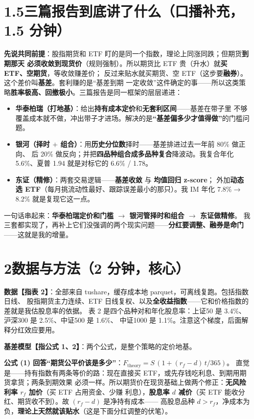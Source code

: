 \documentclass[11pt]{ctexart}
\newcommand{\cue}[1]{{\color{cue}\textbf{【#1】}}}
\begin{document}
\section*{1.5\quad 三篇报告到底讲了什么（口播补充，1.5 分钟）}
\textbf{先说共同前提}：股指期货和 ETF 盯的是同一个指数，理论上同涨同跌；但期货\textbf{到期那天
必须收敛到现货价}（规则强制）。所以期货比 ETF 贵（升水）就\textbf{买 ETF、空期货}，等收敛赚差价；
反过来贴水就买期货、空 ETF（这步要\textbf{融券}）。这个差价叫\textbf{基差}。套利赚的是``基差到期
一定收敛''这件确定的事——所以这类策略\textbf{胜率极高、回撤极小}。三篇报告是同一框架的层层递进：

\begin{itemize}
  \item \textbf{华泰柏瑞（打地基）}：给出\textbf{持有成本定价}和\textbf{无套利区间}——基差在带子里
        不够覆盖成本就不做，冲出带子才进场。解决的是\textbf{``基差偏多少才值得做''}的门槛问题。
  \item \textbf{银河（择时 $+$ 组合）}：用\textbf{历史分位数}择时——基差排进过去一年前 80\% 做正向、
        后 20\% 做反向；并把\textbf{四品种组合成多品种复合}降波动。我复合年化 5.6\%、夏普 1.94
        就是对标它的 6.6\% / 1.78。
  \item \textbf{东证（精修）}：两套交易逻辑——\textbf{基差收敛} 与 \textbf{均值回归 z-score}；
        外加\textbf{动态选 ETF}（每月挑流动性最好、跟踪误差最小的那只）。我 IM 年化 7.8\%$\to$8.2\%
        就是复现它这一点。
\end{itemize}

\noindent 一句话串起来：\textbf{华泰柏瑞定价和门槛 $\to$ 银河管择时和组合 $\to$ 东证做精修}。
我三套都实现了，再补上它们没强调的两个现实问题——\textbf{分红要调整、融券是命门}——这就是我的增量。

\section*{2\quad 数据与方法（2 分钟，核心）\quad \cue{第 2 节，表 2 + 公式}}
\textbf{数据}\cue{指表 2}：全部来自 tushare，缓存成本地 parquet，可离线复跑。包括指数日线、
股指期货主力连续、ETF 日线复权、以及\textbf{全收益指数}——它和价格指数的差就是我估股息率的依据。
表 2 是四个品种对和年化股息率：上证50 是 3.4\%、沪深300 是 2.5\%、中证500 是 1.6\%、
中证1000 是 1.1\%。注意这个梯度，后面解释分红效应要用。

\textbf{基差模型}\cue{指公式 1、2}：两个公式，是整个策略的定价地基。

\textbf{公式 (1) 回答``期货公平价该是多少''}：$F_{\text{theory}} = S\,(1+(r_f-d)\,t/365)$。
直觉是——持有指数有两条等价的路：现在直接买 ETF，或先存钱吃利息、到期用期货拿货；两条到期效果
必须一样。所以期货价在现货基础上做两个修正：\textbf{无风险利率 $r_f$ 加价}（买 ETF 占用资金、少赚
利息），\textbf{股息率 $d$ 减价}（买 ETF 能收分红、期货收不到）。故 $(r_f-d)$ 是净持有成本——
高股息品种 $d>r_f$，净成本为负，\textbf{理论上天然就该贴水}（这是下面分红调整的伏笔）。
\end{document}
